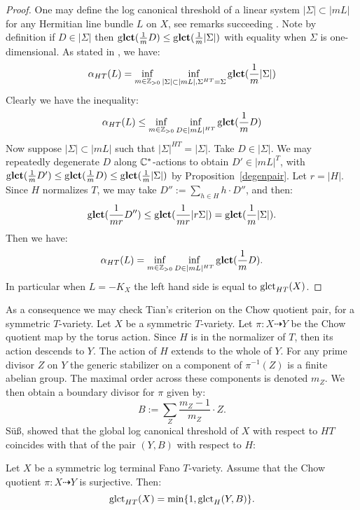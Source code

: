 \begin{proof}
One may define the log canonical threshold of a linear system \(|\Sigma| \subset |mL|\) for any Hermitian line bundle \(L\) on \(X\), see remarks succeeding \cite[Definition A.2]{cheltsov08}. Note by definition if \(D \in |\Sigma|\) then \(\operatorname{g\bf{lct}}(\frac{1}{m} D) \le \operatorname{g\bf{lct}}( \frac{1}{m} |\Sigma|)\) with equality when \(\Sigma\) is one-dimensional. As stated in \cite[(A.1)]{cheltsov08}, we have:
\[
\alpha_{HT}(L) = \inf_{m \in \mathbb{Z}_{>0}} \inf_{|\Sigma| \subset |mL|, \Sigma^{HT} = \Sigma} \operatorname{g\bf{lct}} ( \frac{1}{m} |\Sigma| ) 
\]
Clearly we have the inequality:
\[
\alpha_{HT}(L)  \le \inf_{m \in \mathbb{Z}_{>0}} \inf_{D \in |mL|^{HT}} \operatorname{g\bf{lct}} (\frac{1}{m} D) 
\]
Now suppose \(|\Sigma| \subset |mL|\) such that \(|\Sigma|^{HT} = |\Sigma|\). Take \(D \in |\Sigma|\). We may repeatedly degenerate \(D\) along \(\mathbb{C}^*\)-actions to obtain \(D' \in |mL|^{T}\), with \(\operatorname{g\bf{lct}}(\frac{1}{m}D') \le \operatorname{g\bf{lct}}(\frac{1}{m}D) \le \operatorname{g\bf{lct}}( \frac{1}{m}|\Sigma|)\) by Proposition~\ref{degenpair}. Let \(r = |H|\). Since \(H\) normalizes \(T\), we may take \(D'':= \sum_{h \in H} h \cdot D''\), and then:
\[
\operatorname{g\bf{lct}}(\frac{1}{m r }D'') \le \operatorname{g\bf{lct}}( \frac{1}{mr} | r\Sigma|) = \operatorname{g\bf{lct}}( \frac{1}{m}|\Sigma|).
\]
Then we have:
\[
\alpha_{HT}(L) = \inf_{m \in \mathbb{Z}_{>0}} \inf_{D \in |mL|^{HT}} \operatorname{g\bf{lct}} (\frac{1}{m} D).
\]
In particular when \(L = -K_X\) the left hand side is equal to \(\operatorname{glct}_{HT}(X)\).
\end{proof}
As a consequence we may check Tian's criterion on the Chow quotient pair, for a symmetric \(T\)-variety. Let \(X\) be a symmetric \(T\)-variety. Let \(\pi:X \dashrightarrow Y\) be the Chow quotient map by the torus action. Since \(H\) is in the normalizer of \(T\), then its action descends to \(Y\). The action of \(H\) extends to the whole of \(Y\). For any prime divisor \(Z\) on \(Y\) the generic stabilizer on a component of \(\pi^{-1}(Z)\) is a finite abelian group. The maximal order across these components is denoted \(m_Z\). We then obtain a boundary divisor for \(\pi\) given by:
\[
B := \sum_Z \frac{m_Z-1}{m_Z} \cdot Z.
\]
S{\"u}{\ss}, showed that the global log canonical threshold of \(X\) with respect to \(HT\) coincides with that of the pair \((Y,B)\) with respect to \(H\):
\begin{theorem}[ {\cite[Theorem 1.2]{Su13}}]\label{thm:SU}
Let \(X\) be a symmetric log terminal Fano \(T\)-variety. Assume that the Chow quotient \(\pi:X \dashrightarrow Y\) is surjective. Then:
\[
\operatorname{glct}_{HT}(X) = \min \{1, \operatorname{glct}_H(Y,B) \}.
\]
\end{theorem}
%
%
%
%
%
%

